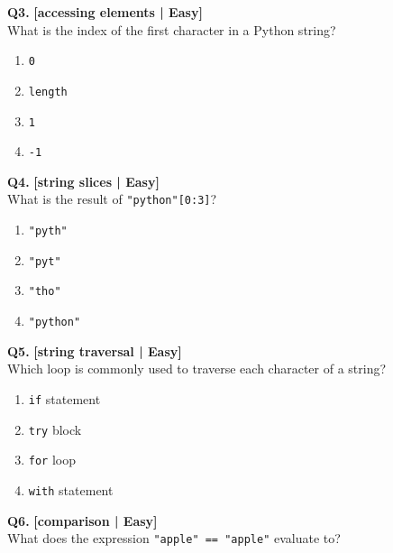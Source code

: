 \noindent\textbf{Q3.} \hfill {\small\color{LPUOrange}\textbf{[accessing elements | Easy]}}\\[2pt]
What is the index of the first character in a Python string?

\begin{enumerate}[label=(\alph*),topsep=2pt,itemsep=1pt,partopsep=0pt,parsep=0pt]
    \item \relax \texttt{0}
    \item \relax \texttt{length}
    \item \relax \texttt{1}
    \item \relax \texttt{-1}
\end{enumerate}
\vspace{2mm}

\noindent\textbf{Q4.} \hfill {\small\color{LPUOrange}\textbf{[string slices | Easy]}}\\[2pt]
What is the result of \texttt{"python"[0:3]}?

\begin{enumerate}[label=(\alph*),topsep=2pt,itemsep=1pt,partopsep=0pt,parsep=0pt]
    \item \relax \texttt{"pyth"}
    \item \relax \texttt{"pyt"}
    \item \relax \texttt{"tho"}
    \item \relax \texttt{"python"}
\end{enumerate}
\vspace{2mm}

\noindent\textbf{Q5.} \hfill {\small\color{LPUOrange}\textbf{[string traversal | Easy]}}\\[2pt]
Which loop is commonly used to traverse each character of a string?

\begin{enumerate}[label=(\alph*),topsep=2pt,itemsep=1pt,partopsep=0pt,parsep=0pt]
    \item \relax \texttt{if} statement
    \item \relax \texttt{try} block
    \item \relax \texttt{for} loop
    \item \relax \texttt{with} statement
\end{enumerate}
\vspace{2mm}

\noindent\textbf{Q6.} \hfill {\small\color{LPUOrange}\textbf{[comparison | Easy]}}\\[2pt]
What does the expression \texttt{"apple" == "apple"} evaluate to?

